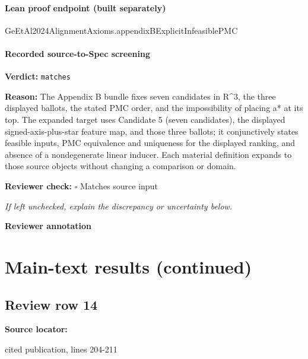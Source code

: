 \documentclass[10pt]{article}
\newcommand{\reviewerbox}{%
  \par\noindent\fbox{\parbox{0.96\linewidth}{\rule{0pt}{0.38in}}}\par
}
\newcommand{\reviewmatch}[1]{%
  \par\noindent\textbf{Reviewer check:} $\square$\; #1\par
  \noindent\emph{If left unchecked, explain the discrepancy or uncertainty below.}\par
}
\begin{document}
\paragraph{Lean proof endpoint (built separately)}\begin{ReviewVerbatim}
GeEtAl2024AlignmentAxioms.appendixBExplicitInfeasiblePMC
\end{ReviewVerbatim}

\paragraph{Recorded source-to-Spec screening}
\textbf{Verdict:} \texttt{matches}
\\
{\raggedright
\textbf{Reason:} The Appendix B bundle fixes seven candidates in R\textasciicircum{}3, the three displayed ballots, the stated PMC order, and the impossibility of placing a* at its top.\allowbreak{}  The expanded target uses Candidate 5 (seven candidates), the displayed signed-\allowbreak{}axis-\allowbreak{}plus-\allowbreak{}star feature map, and those three ballots;\allowbreak{} it conjunctively states feasible inputs, PMC equivalence and uniqueness for the displayed ranking, and absence of a nondegenerate linear inducer.\allowbreak{}  Each material definition expands to those source objects without changing a comparison or domain.\allowbreak{}
\par}
\reviewmatch{Matches source input}
\noindent\textbf{Reviewer annotation}\par
\reviewerbox
\clearpage
\hypertarget{source-claim-d1dd75b258d030ee}{}
\hypertarget{source-section-8dd20b70fbd87b55}{}
\section*{Main-text results (continued)}
\subsection*{Review row 14}
\textbf{Source locator:} {\footnotesize\raggedright cited publication, lines 204-\allowbreak{}211\par}
\end{document}
